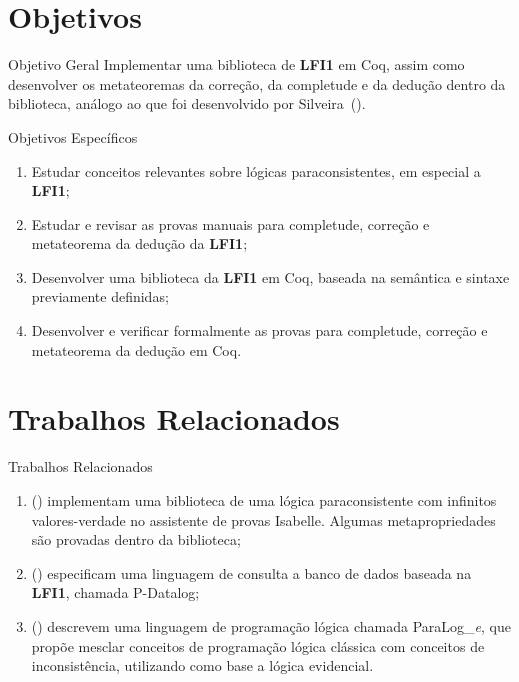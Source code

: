 \documentclass[table]{beamer}
\newcommand{\lfium}{{\normalfont\textbf{LFI1}}}
\begin{document}
\section[]{Objetivos}
    \begin{frame}{Objetivo Geral}
        Implementar uma biblioteca de \lfium{} em Coq, assim como desenvolver os metateoremas da correção, da completude e da dedução dentro da biblioteca, análogo ao que foi desenvolvido por Silveira~(\citeyear{silveira2020implementacao}).
    \end{frame}

    \begin{frame}{Objetivos Específicos}
        \begin{enumerate}
			\item Estudar conceitos relevantes sobre lógicas paraconsistentes, em especial a \lfium{};
            \item Estudar e revisar as provas manuais para completude, correção e metateorema da dedução da \lfium{};
            \item Desenvolver uma biblioteca da \lfium{} em Coq, baseada na semântica e sintaxe previamente definidas;
            \item Desenvolver e verificar formalmente as provas para completude, correção e metateorema da dedução em Coq.
		\end{enumerate}
    \end{frame}

\section[]{Trabalhos Relacionados}
    \begin{frame}{Trabalhos Relacionados}
        \begin{enumerate}
            \item {} (\citeyear{Villadsen2017}) implementam uma biblioteca de uma lógica paraconsistente com infinitos valores-verdade no assistente de provas Isabelle. Algumas metapropriedades são provadas dentro da biblioteca;
            \item {} (\citeyear{pdatalog}) especificam uma linguagem de consulta a banco de dados baseada na \lfium{}, chamada P{-}Datalog;
            \item {} (\citeyear{paralog}) descrevem uma linguagem de programação lógica chamada ParaLog\_\textit{e}, que propõe mesclar conceitos de programação lógica clássica com conceitos de inconsistência, utilizando como base a lógica evidencial.
        \end{enumerate}
    \end{frame}
\end{document}
